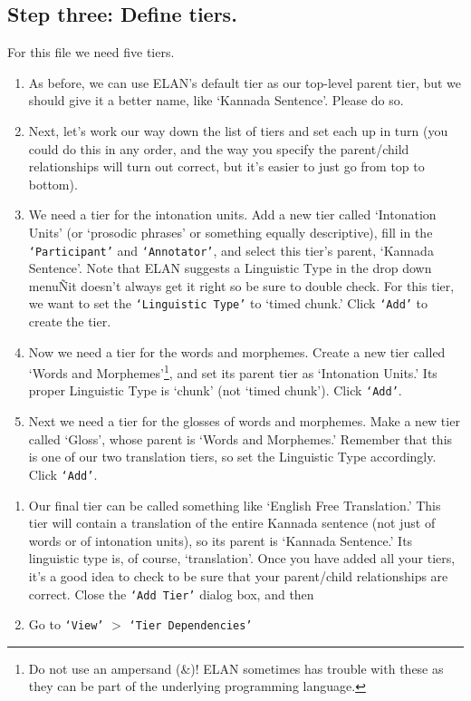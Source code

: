 \documentclass[letterpaper,12pt]{article}
\begin{document}
\subsection*{Step three: Define tiers.}
For this file we need five tiers.
\begin{enumerate}
\item As before, we can use ELAN's default tier as our top-level parent tier, but we should give it a better name, like `Kannada Sentence'. Please do so.
\item Next, let's work our way down the list of tiers and set each up in turn (you could do this in any order, and the way you specify the parent/child relationships will turn out correct, but it's easier to just go from top to bottom).
\item We need a tier for the intonation units. Add a new tier called `Intonation Units' (or
`prosodic phrases' or something equally descriptive), fill in the \texttt{`Participant'} and \texttt{`Annotator'}, and select this tier's parent, `Kannada Sentence'. Note that ELAN suggests a Linguistic Type in the drop down menuÑit doesn't always get it right so be sure to double check. For this tier, we want to set the \texttt{`Linguistic Type'} to `timed chunk.' Click \texttt{`Add'} to create the tier.
\item Now we need a tier for the words and morphemes. Create a new tier called `Words and Morphemes'\footnote{Do not use an ampersand (\&)! ELAN sometimes has trouble with these as they can be part of the underlying programming language.}, and set its parent tier as `Intonation Units.' Its proper Linguistic Type is `chunk' (not `timed chunk'). Click \texttt{`Add'}.
\item Next we need a tier for the glosses of words and morphemes. Make a new tier called `Gloss', whose parent is `Words and Morphemes.' Remember that this is one of our two translation tiers, so set the Linguistic Type accordingly. Click \texttt{`Add'}.
\end{enumerate}

\begin{enumerate}
\item Our final tier can be called something like `English Free Translation.' This tier will contain a translation of the entire Kannada sentence (not just of words or of intonation units), so its parent is `Kannada Sentence.' Its linguistic type is, of course, `translation'.
Once you have added all your tiers, it's a good idea to check to be sure that your parent/child relationships are correct. Close the \texttt{`Add Tier'} dialog box, and then 
\item Go to \texttt{`View'} $>$ \texttt{`Tier Dependencies'}
\end{enumerate}
\newpage
\end{document}
